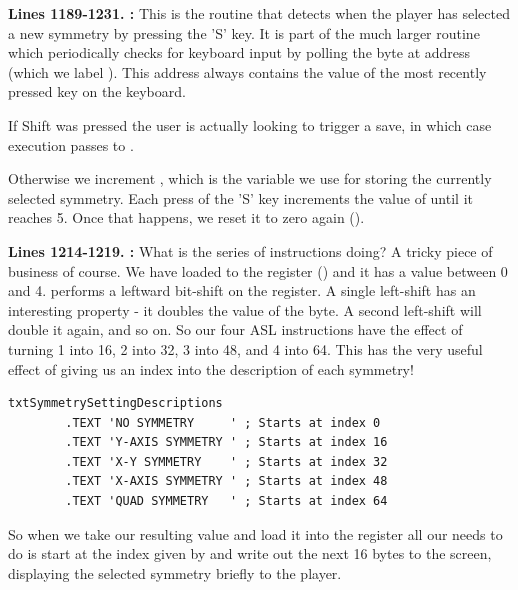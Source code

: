\textbf{Lines 1189-1231. :} This is the routine that detects when the player has selected a new
symmetry by pressing the 'S' key. It is part of the much larger routine  which periodically checks
for keyboard input by polling the byte at address  (which we label ). This address always
contains the value of the most recently pressed key on the keyboard.

If Shift was pressed the user is actually looking to trigger a save, in which case execution passes to .

Otherwise we increment , which is the variable we use for storing the currently selected symmetry.
Each press of the 'S' key increments the value of  until it reaches 5. Once that happens, we 
reset it to zero again ().

\textbf{Lines 1214-1219. :} What is the series of  instructions doing? A tricky
piece of business of course. We have loaded  to the  register () and it has a value between 0 and 4.
 performs a leftward bit-shift on the  register. A single left-shift has an interesting property - it doubles the
value of the byte. A second left-shift will double it again, and so on. So our four {ASL} instructions have the effect of turning 1 into
16, 2 into 32, 3 into 48, and 4 into 64. This has the very useful effect of giving us an index into the description of each symmetry!

\begin{lstlisting}
txtSymmetrySettingDescriptions 
        .TEXT 'NO SYMMETRY     ' ; Starts at index 0
        .TEXT 'Y-AXIS SYMMETRY ' ; Starts at index 16
        .TEXT 'X-Y SYMMETRY    ' ; Starts at index 32
        .TEXT 'X-AXIS SYMMETRY ' ; Starts at index 48
        .TEXT 'QUAD SYMMETRY   ' ; Starts at index 64
\end{lstlisting}

So when we take our resulting value and load it into the  register all our  needs to do is start at the 
index given by  and write out the next 16 bytes to the screen, displaying the selected symmetry briefly to the player.


